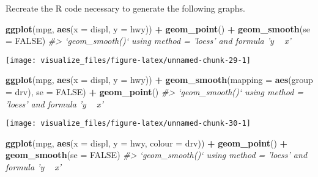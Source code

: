 \documentclass[]{book}
\newenvironment{Shaded}{\begin{snugshade}}{\end{snugshade}}
\newcommand{\CommentTok}[1]{\textcolor[rgb]{0.56,0.35,0.01}{\textit{#1}}}
\newcommand{\DataTypeTok}[1]{\textcolor[rgb]{0.13,0.29,0.53}{#1}}
\newcommand{\KeywordTok}[1]{\textcolor[rgb]{0.13,0.29,0.53}{\textbf{#1}}}
\newcommand{\NormalTok}[1]{#1}
\newcommand{\OperatorTok}[1]{\textcolor[rgb]{0.81,0.36,0.00}{\textbf{#1}}}
\newcommand{\OtherTok}[1]{\textcolor[rgb]{0.56,0.35,0.01}{#1}}
\newcommand{\StringTok}[1]{\textcolor[rgb]{0.31,0.60,0.02}{#1}}
\theoremstyle{plain}
\theoremstyle{remark}
\theoremstyle{definition}
\theoremstyle{definition}
\theoremstyle{definition}
\theoremstyle{remark}
\begin{document}
Recreate the R code necessary to generate the following graphs.

\begin{Shaded}
\begin{Highlighting}[]
\KeywordTok{ggplot}\NormalTok{(mpg, }\KeywordTok{aes}\NormalTok{(}\DataTypeTok{x =}\NormalTok{ displ, }\DataTypeTok{y =}\NormalTok{ hwy)) }\OperatorTok{+}
\StringTok{  }\KeywordTok{geom_point}\NormalTok{() }\OperatorTok{+}
\StringTok{  }\KeywordTok{geom_smooth}\NormalTok{(}\DataTypeTok{se =} \OtherTok{FALSE}\NormalTok{)}
\CommentTok{#> `geom_smooth()` using method = 'loess' and formula 'y ~ x'}
\end{Highlighting}
\end{Shaded}

\begin{center}\texttt{[image: visualize\_files/figure-latex/unnamed-chunk-29-1]} \end{center}

\begin{Shaded}
\begin{Highlighting}[]
\KeywordTok{ggplot}\NormalTok{(mpg, }\KeywordTok{aes}\NormalTok{(}\DataTypeTok{x =}\NormalTok{ displ, }\DataTypeTok{y =}\NormalTok{ hwy)) }\OperatorTok{+}
\StringTok{  }\KeywordTok{geom_smooth}\NormalTok{(}\DataTypeTok{mapping =} \KeywordTok{aes}\NormalTok{(}\DataTypeTok{group =}\NormalTok{ drv), }\DataTypeTok{se =} \OtherTok{FALSE}\NormalTok{) }\OperatorTok{+}
\StringTok{  }\KeywordTok{geom_point}\NormalTok{()}
\CommentTok{#> `geom_smooth()` using method = 'loess' and formula 'y ~ x'}
\end{Highlighting}
\end{Shaded}

\begin{center}\texttt{[image: visualize\_files/figure-latex/unnamed-chunk-30-1]} \end{center}

\begin{Shaded}
\begin{Highlighting}[]
\KeywordTok{ggplot}\NormalTok{(mpg, }\KeywordTok{aes}\NormalTok{(}\DataTypeTok{x =}\NormalTok{ displ, }\DataTypeTok{y =}\NormalTok{ hwy, }\DataTypeTok{colour =}\NormalTok{ drv)) }\OperatorTok{+}
\StringTok{  }\KeywordTok{geom_point}\NormalTok{() }\OperatorTok{+}
\StringTok{  }\KeywordTok{geom_smooth}\NormalTok{(}\DataTypeTok{se =} \OtherTok{FALSE}\NormalTok{)}
\CommentTok{#> `geom_smooth()` using method = 'loess' and formula 'y ~ x'}
\end{Highlighting}
\end{Shaded}
\end{document}
